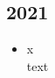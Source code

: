 
\subsection*{2021}
\begin{history}

    \begin{itemize}

        \item x\\
              text

    \end{itemize}

\end{history}
